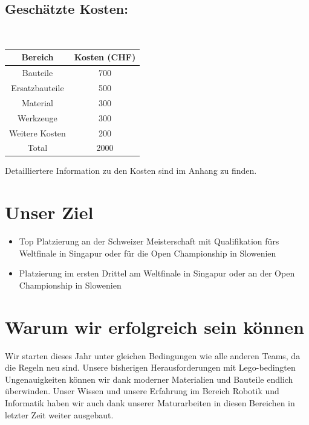 \documentclass[11pt]{article}
\begin{document}
    \subsection*{Geschätzte Kosten:}\\

    \begin{center}
        \begin{tabular}{|c|c|}
            \hline
            \textbf{Bereich} & \textbf{Kosten (CHF)} \\
            \hline
            Bauteile         & 700                   \\
            Ersatzbauteile   & 500                   \\
            Material         & 300                   \\
            Werkzeuge        & 300                   \\
            Weitere Kosten   & 200                   \\
            \hline
            Total            & 2000                  \\
            \hline
        \end{tabular}
    \end{center}

    \noindent Detailliertere Information zu den Kosten sind im Anhang zu finden.


    \section*{Unser Ziel}
    \begin{itemize}
        \item Top Platzierung an der Schweizer Meisterschaft mit Qualifikation f\"urs Weltfinale in Singapur oder für die Open Championship in Slowenien
        \item Platzierung im ersten Drittel am Weltfinale in Singapur oder an der Open Championship in Slowenien
    \end{itemize}

    \section*{Warum wir erfolgreich sein können}

    Wir starten dieses Jahr unter gleichen Bedingungen wie alle anderen Teams, da die Regeln neu sind.
    Unsere bisherigen Herausforderungen mit Lego-bedingten Ungenauigkeiten können wir dank moderner Materialien und Bauteile endlich überwinden.
    Unser Wissen und unsere Erfahrung im Bereich Robotik und Informatik haben wir auch dank unserer Maturarbeiten in diesen Bereichen in letzter Zeit weiter ausgebaut.
\end{document}
